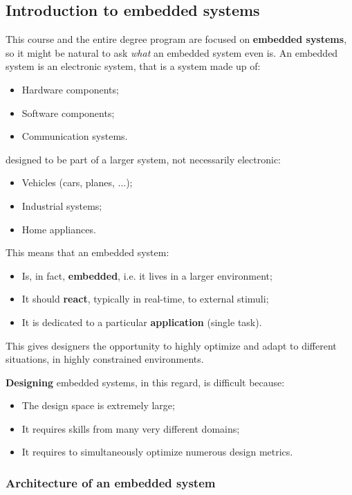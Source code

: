 \documentclass[a4paper,11pt]{article}
\begin{document}
\subsection{Introduction to embedded systems}

This course and the entire degree program are focused on \textbf{embedded systems}, so it might be natural to ask \textit{what} an embedded system even is.
An embedded system is an electronic system, that is a system made up of:
\begin{itemize}
	\item Hardware components;
	\item Software components;
	\item Communication systems.
\end{itemize}
designed to be part of a larger system, not necessarily electronic:
\begin{itemize}
	\item Vehicles (cars, planes, ...);
	\item Industrial systems;
	\item Home appliances.
\end{itemize}

This means that an embedded system:
\begin{itemize}
	\item Is, in fact, \textbf{embedded}, i.e. it lives in a larger environment;
	\item It should \textbf{react}, typically in real-time, to external stimuli;
	\item It is dedicated to a particular \textbf{application} (single task).
\end{itemize}

This gives designers the opportunity to highly optimize and adapt to different situations, in highly constrained environments.

\textbf{Designing} embedded systems, in this regard, is difficult because:
\begin{itemize}
	\item The design space is extremely large;
	\item It requires skills from many very different domains;
	\item It requires to simultaneously optimize numerous design metrics.
\end{itemize}

\subsubsection{Architecture of an embedded system}
\end{document}
